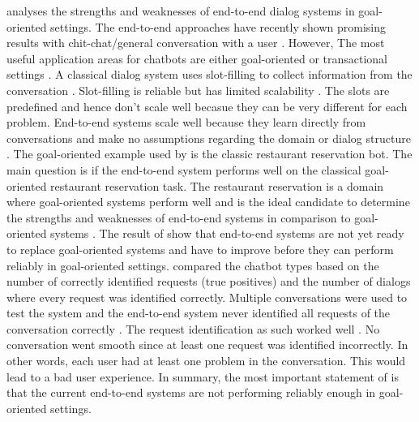 \citet{bordes2016learning} analyses the strengths and weaknesses of end-to-end dialog systems in goal-oriented settings.
The end-to-end approaches have recently shown promising results with chit-chat/general conversation with a user \cite{bordes2016learning}.
However, The most useful application areas for chatbots are either goal-oriented or transactional settings \cite{bordes2016learning}.
A classical dialog system uses slot-filling to collect information from the conversation \cite{bordes2016learning}.
Slot-filling is reliable but has limited scalability \cite{bordes2016learning}.
The slots are predefined and hence don't scale well becasue they can be very different for each problem. 
End-to-end systems scale well because they learn directly from conversations and make 
no assumptions regarding the domain or dialog structure \cite{bordes2016learning}. 
The goal-oriented example used by \citet{bordes2016learning} is the classic restaurant reservation bot.
The main question is if the end-to-end system performs well on the classical goal-oriented restaurant 
reservation task.
The restaurant reservation is a domain where goal-oriented systems perform well and is the ideal candidate
to determine the strengths and weaknesses of end-to-end systems in comparison to goal-oriented systems \cite{bordes2016learning}.
The result of \citet{bordes2016learning} show that end-to-end systems are not yet ready to replace goal-oriented 
systems and have to improve before they can perform reliably in goal-oriented settings. 
\citet{bordes2016learning} compared the chatbot types based on the number of correctly identified requests (true positives)
and the number of dialogs where every request was identified correctly.
Multiple conversations were used to test the system and the end-to-end system never identified 
all requests of the conversation correctly \cite{bordes2016learning}.
The request identification as such worked well \cite{bordes2016learning}.
No conversation went smooth since at least one request was identified incorrectly.
In other words, each user had at least one problem in the conversation.
This would lead to a bad user experience. 
In summary, the most important statement of \citet{bordes2016learning} is that the current end-to-end systems are
not performing reliably enough in goal-oriented settings.

